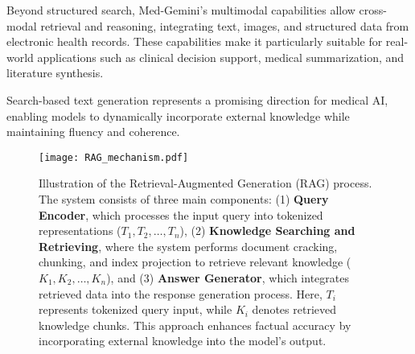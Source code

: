 Beyond structured search, Med-Gemini’s multimodal capabilities allow cross-modal retrieval and reasoning, integrating text, images, and structured data from electronic health records. These capabilities make it particularly suitable for real-world applications such as clinical decision support, medical summarization, and literature synthesis.

Search-based text generation represents a promising direction for medical AI, enabling models to dynamically incorporate external knowledge while maintaining fluency and coherence.

\begin{figure}
\vskip 0.2in
\begin{center}
\centerline{\texttt{[image: RAG\_mechanism.pdf]}}
\caption{Illustration of the Retrieval-Augmented Generation (RAG) process. The system consists of three main components: (1) \textbf{Query Encoder}, which processes the input query into tokenized representations (\(T_1, T_2, \dots, T_n \)), (2) \textbf{Knowledge Searching and Retrieving}, where the system performs document cracking, chunking, and index projection to retrieve relevant knowledge (\(K_1, K_2, \dots, K_n\)), and (3) \textbf{Answer Generator}, which integrates retrieved data into the response generation process. Here, \(T_i\) represents tokenized query input, while \(K_i\) denotes retrieved knowledge chunks. This approach enhances factual accuracy by incorporating external knowledge into the model’s output.}
\label{RAG_mechanism}
\end{center}
\vskip -0.2in
\end{figure}
